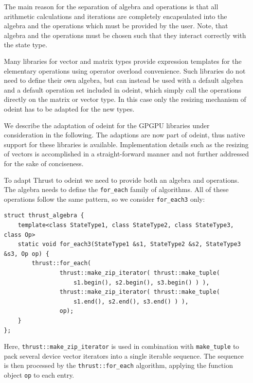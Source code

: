 \documentclass[final]{siamltex}
\newcommand{\code}[1]{\lstinline|#1|}
\begin{document}
The main reason for the separation of algebra and operations is that
all arithmetic calculations and iterations are completely encapsulated
into the algebra and the operations which must be provided by the
user. Note, that algebra and the operations must be chosen such that
they interact correctly with the state type.

Many libraries for vector and matrix types provide expression templates
\cite{Veldhuizen:ExpressionTemplates, Veldhuizen:Techniques,
Vandevoorde:CppTemplates} for the elementary operations using operator overload
convenience.  Such libraries do not need to define their own algebra, but can
instead be used with a default algebra and a default operation set included in
odeint, which simply call the operations directly on the matrix or vector type.
In this case only the resizing mechanism of odeint has to be adapted for the
new types.

We describe the adaptation of odeint for the GPGPU libraries under
consideration in the following. The adaptions are now part of odeint, thus
native support for these libraries is available.  Implementation details such as
the resizing of vectors is accomplished in a straight-forward manner and not
further addressed for the sake of conciseness.

To adapt Thrust to odeint we need to provide both an algebra and
operations. The algebra needs to define the \code{for_each} family of
algorithms. All of these operations follow the same pattern,
so we consider \code{for_each3} only:
\begin{lstlisting}
struct thrust_algebra {
    template<class StateType1, class StateType2, class StateType3, class Op>
    static void for_each3(StateType1 &s1, StateType2 &s2, StateType3 &s3, Op op) {
        thrust::for_each(
                thrust::make_zip_iterator( thrust::make_tuple(
                    s1.begin(), s2.begin(), s3.begin() ) ),
                thrust::make_zip_iterator( thrust::make_tuple(
                    s1.end(), s2.end(), s3.end() ) ),
                op);
    }
};
\end{lstlisting}
Here, \code{thrust::make_zip_iterator} is used in combination with
\code{make_tuple} to pack several device vector iterators into a single
iterable sequence.  The sequence is then processed by the
\code{thrust::for_each} algorithm, applying the function object \code{op} to
each entry.
\end{document}
